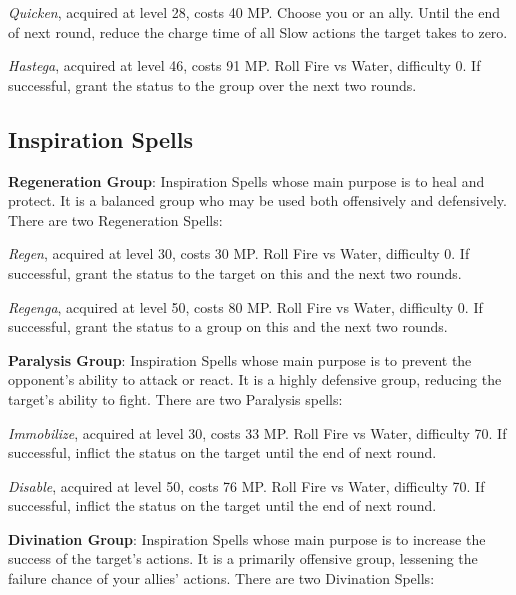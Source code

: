 \begin{multicols}{2}
    \textit{Quicken}, acquired at level 28, costs 40 MP\@. Choose you or an ally. Until the end of next round, reduce the charge time of all Slow actions the target takes to zero.

    \textit{Hastega}, acquired at level 46, costs 91 MP\@. Roll Fire vs Water, difficulty 0. If successful, grant the  status to the group over the next two rounds.

    \subsection{Inspiration Spells}\label{subsec:time-inspiration}

    \textbf{Regeneration Group}: Inspiration Spells whose main purpose is to heal and protect. It is a balanced group who may be used both offensively and defensively. There are two Regeneration Spells:
    
    \textit{Regen}, acquired at level 30, costs 30 MP\@. Roll Fire vs Water, difficulty 0. If successful, grant the  status to the target on this and the next two rounds.
    
    \textit{Regenga}, acquired at level 50, costs 80 MP\@. Roll Fire vs Water, difficulty 0. If successful, grant the  status to a group on this and the next two rounds.
 
    \ffcrystal[type=level,height=8pt]
   
    \textbf{Paralysis Group}: Inspiration Spells whose main purpose is to prevent the opponent's ability to attack or react. It is a highly defensive group, reducing the target’s ability to fight. There are two Paralysis spells:
    
    \textit{Immobilize}, acquired at level 30, costs 33 MP\@. Roll Fire vs Water, difficulty 70. If successful, inflict the  status on the target until the end of next round.
    
    \textit{Disable}, acquired at level 50, costs 76 MP\@. Roll Fire vs Water, difficulty 70. If successful, inflict the  status on the target until the end of next round.
    
    \ffcrystal[type=level,height=8pt]

    \textbf{Divination Group}: Inspiration Spells whose main purpose is to increase the success of the target’s actions. It is a primarily offensive group, lessening the failure chance of your allies’ actions. There are two Divination Spells:
    

\end{multicols}
